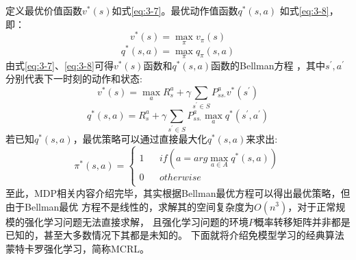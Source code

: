定义最优价值函数$v^*(s)$如式\eqref{eq:3-7}。最优动作值函数$q^*(s,a)$
如式\eqref{eq:3-8}，即：
\begin{equation}
  v^*(s)=\max\limits_{\pi} v_\pi(s)
  \label{eq:3-7}
\end{equation}
\begin{equation}
  q^*(s,a)=\max\limits_{\pi} q_\pi(s,a)
  \label{eq:3-8}
\end{equation}
由式\eqref{eq:3-7}、\eqref{eq:3-8}可得$v^*(s)$函数和$q^*(s,a)$函数的Bellman方程
，其中$s^{'},a^{'}$分别代表下一时刻的动作和状态:
\begin{equation}
  v^*(s)=\max\limits_{a}R_s^a+\gamma \sum_{s^{'}\in{S}}P_{ss_{'}}^av^*(s^{'}) 
  \label{eq:3-9}
\end{equation}
\begin{equation}
  q^*(s,a)=R_s^a+\gamma \sum_{s^{'}\in{S}}P_{ss_{'}}^a\max\limits_{a}q^*(s^{'},a^{'}) 
  \label{eq:3-10}
\end{equation}
若已知$q^*(s,a)$，最优策略可以通过直接最大化$q^*(s,a)$来求出:
\begin{equation}
 \pi ^*(s,a)=\left\{
\begin{array}{rcl}
1       &      & {if(a=arg\max\limits_{a\in{A}} q^*(s,a))}\\
0     &      & {otherwise}\\


\end{array} \right. 
\label{eq:3-11}
\end{equation}
至此，MDP相关内容介绍完毕，其实根据Bellman最优方程可以得出最优策略，但由于Bellman最优
方程不是线性的，求解其的空间复杂度为$O(n^3)$，对于正常规模的强化学习问题无法直接求解，
且强化学习问题的环境$P$概率转移矩阵并非都是已知的，甚至大多数情况下其都是未知的。
下面就将介绍免模型学习的经典算法蒙特卡罗强化学习，简称MCRL。
